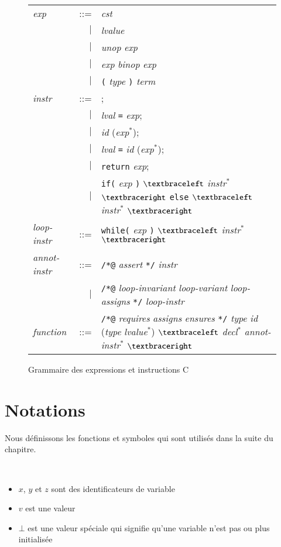 \begin{figure}[tb]
  \begin{tabular}{lrl}
    \textit{exp} & ::= & \textit{cst} \\
    & $\mid$ & \textit{lvalue} \\
    & $\mid$ & \textit{unop} \textit{exp} \\
    & $\mid$ & \textit{exp} \textit{binop} \textit{exp} \\
    & $\mid$ & \lstinline'(' \textit{type} \lstinline')' \textit{term} \\
    \textit{instr} & ::= & ; \\
    & $\mid$ & \textit{lval} \lstinline'=' \textit{exp}; \\
    & $\mid$ & \textit{id} (\textit{exp}$^{*}$); \\
    & $\mid$ & \textit{lval} \lstinline'=' \textit{id} (\textit{exp}$^{*}$); \\
    & $\mid$ & \lstinline'return' \textit{exp}; \\
    & $\mid$ & \lstinline'if(' \textit{exp} \lstinline')'
    $\bopen$ \textit{instr}$^*$ $\bclose$
    \lstinline'else' $\bopen$ \textit{instr}$^*$ $\bclose$ \\
    \textit{loop-instr} & ::= & \lstinline'while(' \textit{exp} \lstinline')'
    $\bopen$ \textit{instr}$^*$ $\bclose$ \\
    \textit{annot-instr} & ::= & \lstinline'/*@' \textit{assert} \lstinline'*/'
    \textit{instr} \\
    & $\mid$ & \lstinline'/*@' \textit{loop-invariant} \textit{loop-variant}
    \textit{loop-assigns} \lstinline'*/' \textit{loop-instr} \\
    \textit{function} & ::= & \lstinline'/*@' \textit{requires} \textit{assigns}
    \textit{ensures} \lstinline'*/' \textit{type} \textit{id}
    (\textit{type} \textit{lvalue}$^{*}$)
    $\bopen$ \textit{decl}$^{*}$ \textit{annot-instr}$^{*}$
    $\bclose$
  \end{tabular}
  \caption{Grammaire des expressions et instructions C}
  \label{fig:gram-c}
\end{figure}


\section{Notations}
\label{sec:notations}


Nous définissons les fonctions et symboles qui sont utilisés dans la suite du
chapitre.

\begin{notation}
  ~
  \begin{itemize}
  \item $x$, $y$ et $z$ sont des identificateurs de variable
  \item $v$ est une valeur
  \item $\bot$ est une valeur spéciale qui signifie qu'une variable n'est pas
    ou plus initialisée
  \end{itemize}
\end{notation}


